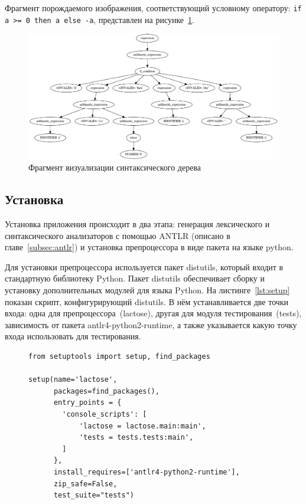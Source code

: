 \documentclass[12pt,a4paper,oneside]{extarticle}
\begin{document}
            Фрагмент порождаемого изображения, соответствующий условному оператору: \lstinline$if a >= 0 then a else -a$, представлен на рисунке~\ref{pic:tree}.
            \begin{figure}[h!]
                \center
                \includegraphics[scale=0.3]{tree.png}
                \caption{Фрагмент визуализации синтаксического дерева}
                \label{pic:tree}
            \end{figure}
    \clearpage

    \subsection{Установка}
        Установка приложения происходит в два этапа: генерация лексического и синтаксического анализаторов с помощью ANTLR (описано в главе~\ref{subsec:antlr}) и установка препроцессора в виде пакета на языке python.
        
        Для установки препроцессора используется пакет distutils, который входит в стандартную библиотеку Python.
        Пакет distutils обеспечивает сборку и установку дополнительных модулей для языка Python.
        На листинге~\ref{lst:setup} показан скрипт, конфигурирующий distutils.
        В нём устанавливается две точки входа: одна для препроцессора~(lactose), другая для модуля тестирования~(tests), зависимость от пакета antlr4-python2-runtime, а также указывается какую точку входа использовать для тестирования.

        \begin{figure}[h!]  
            \begin{lstlisting}[label={lst:setup},caption={Cкрипт конфигурации для утилиты distutils},captionpos=b]
from setuptools import setup, find_packages

setup(name='lactose',
      packages=find_packages(),
      entry_points = {
        'console_scripts': [
            'lactose = lactose.main:main',
            'tests = tests.tests:main',
        ]
      },
      install_requires=['antlr4-python2-runtime'],
      zip_safe=False,
      test_suite="tests")

            \end{lstlisting}
        \end{figure}
\end{document}
